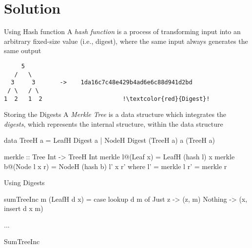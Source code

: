 \section{Solution}

\begin{slide}{Using Hash function}
A \textit{hash function} is a process of transforming input into an arbitrary fixed-size value (i.e., digest), where the same input always generates the same output

\begin{center}
\begin{verbatim}
     5 
   /   \
  3     3       ->    1da16c7c48e429b4ad6e6c88d941d2bd
 / \   / \    
1  2   1  2                       !\textcolor{red}{Digest}!  
\end{verbatim}
\end{center}
\end{slide}



\begin{slide}{Storing the Digests}
A \textit{Merkle Tree} is a data structure which integrates the \textit{digests}, which represents the internal structure, within the data structure

\vspace*{0.4cm}
\begin{haskell}
data TreeH a = LeafH Digest a
             | NodeH Digest (TreeH a) a (TreeH a)


merkle :: Tree Int -> TreeH Int
merkle l@(Leaf x)     = LeafH (hash l) x
merkle b@(Node l x r) = NodeH (hash b) l' x r'
  where
    l' = merkle l
    r' = merkle r
\end{haskell}
\end{slide}

\begin{slide}{Using Digests} 
\begin{haskell}
sumTreeInc m (LeafH d x) = case lookup d m of
  Just z  -> (z, m)
  Nothing -> (x, insert d x m)

...
\end{haskell}

\begin{haskell}
SumTreeInc 
\end{haskell}
\end{slide}

